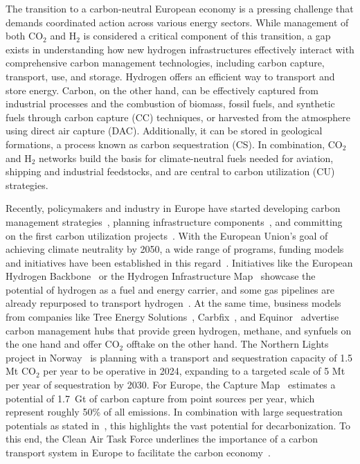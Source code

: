 \documentclass[twocolumn]{article}
\newcommand{\carbon}{CO$_2$}
\newcommand{\hydrogen}{H$_2$}
\begin{document}
The transition to a carbon-neutral European economy is a pressing challenge that demands coordinated action across various energy sectors. While management of both \carbon{} and \hydrogen{} is considered a critical component of this transition, a gap exists in understanding how new hydrogen infrastructures effectively interact with comprehensive carbon management technologies, including carbon capture, transport, use, and storage. Hydrogen offers an efficient way to transport and store energy. Carbon, on the other hand, can be effectively captured from industrial processes and the combustion of biomass, fossil fuels, and synthetic fuels through carbon capture (CC) techniques, or harvested from the atmosphere using direct air capture (DAC). Additionally, it can be stored in geological formations, a process known as carbon sequestration (CS). In combination, \carbon{} and \hydrogen{} networks build the basis for climate-neutral fuels needed for aviation, shipping and industrial feedstocks, and are central to carbon utilization (CU) strategies.

Recently, policymakers and industry in Europe have started developing carbon management strategies~\cite{GermanyDevelopingStrategy2023,CarbonManagementStrategie}, planning infrastructure components~\cite{CONetz}, and committing on the first carbon utilization projects~\cite{EFuelsPilotPlant2022,OrstedAssumesFull,GROUNDBREAKINGEFUELPRODUCTION,DLREfuelsDLR}. With the European Union's goal of achieving climate neutrality by 2050, a wide range of programs, funding models and initiatives have been established in this regard~\cite{eu2023netzero,europeangreendeal,europeaninnovationfund}. Initiatives like the European Hydrogen Backbone~\cite{gasforclimateEuropeanHydrogenBackbone2022} or the Hydrogen Infrastructure Map~\cite{H2InfrastructureMap} showcase the potential of hydrogen as a fuel and energy carrier, and some gas pipelines are already repurposed to transport hydrogen~\cite{RohrFreiFuer}. At the same time, business models from companies like Tree Energy Solutions~\cite{TESHydrogenLife2023}, Carbfix~\cite{WeTurnCO2}, and Equinor~\cite{adomaitisEquinorRWEBuild2023} advertise carbon management hubs that provide green hydrogen, methane, and synfuels on the one hand and offer \carbon{} offtake on the other hand. The Northern Lights project in Norway~\cite{NorthernLightsWhat} is planning with a transport and sequestration capacity of 1.5 Mt \carbon{} per year  to be operative in 2024, expanding to a targeted scale of 5 Mt per year of sequestration by 2030.
For Europe, the Capture Map~\cite{ToolsGreenTransition} estimates a potential of 1.7~Gt of carbon capture from point sources per year, which represent roughly 50\% of all emissions. In combination with large sequestration potentials as stated in~\cite{weiProposedGlobalLayout2021}, this highlights the vast potential for decarbonization.
To this end, the Clean Air Task Force underlines the importance of a carbon transport system in Europe to facilitate the carbon economy~\cite{lockwoodEuropeanStrategyCarbon}.
\end{document}

